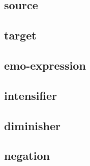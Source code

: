 \documentclass[11pt,a4paper]{article}
\begin{document}
\subsection{source}
\subsection{target}
\subsection{emo-expression}
\subsection{intensifier}
\subsection{diminisher}
\subsection{negation}
\end{document}
